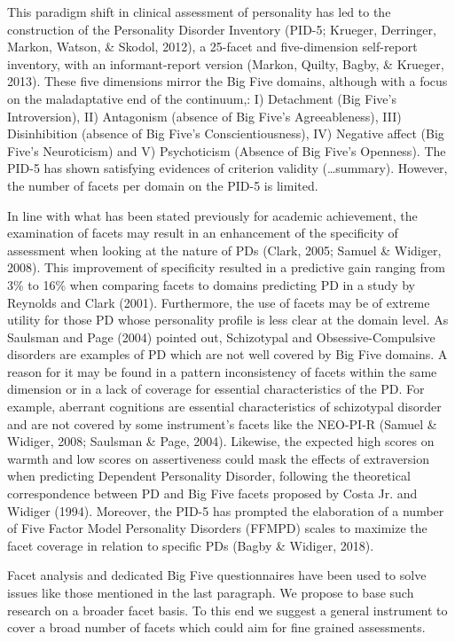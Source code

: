 \documentclass[,man]{apa6}
\theoremstyle{definition}
\theoremstyle{definition}
\theoremstyle{definition}
\theoremstyle{remark}
\begin{document}
This paradigm shift in clinical assessment of personality has led to the
construction of the Personality Disorder Inventory (PID-5; Krueger,
Derringer, Markon, Watson, \& Skodol, 2012), a 25-facet and
five-dimension self-report inventory, with an informant-report version
(Markon, Quilty, Bagby, \& Krueger, 2013). These five dimensions mirror
the Big Five domains, although with a focus on the maladaptative end of
the continuum,: I) Detachment (Big Five's Introversion), II) Antagonism
(absence of Big Five's Agreeableness), III) Disinhibition (absence of
Big Five's Conscientiousness), IV) Negative affect (Big Five's
Neuroticism) and V) Psychoticism (Absence of Big Five's Openness). The
PID-5 has shown satisfying evidences of criterion validity
(\ldots{}summary). However, the number of facets per domain on the PID-5
is limited.

In line with what has been stated previously for academic achievement,
the examination of facets may result in an enhancement of the
specificity of assessment when looking at the nature of PDs (Clark,
2005; Samuel \& Widiger, 2008). This improvement of specificity resulted
in a predictive gain ranging from 3\% to 16\% when comparing facets to
domains predicting PD in a study by Reynolds and Clark (2001).
Furthermore, the use of facets may be of extreme utility for those PD
whose personality profile is less clear at the domain level. As Saulsman
and Page (2004) pointed out, Schizotypal and Obsessive-Compulsive
disorders are examples of PD which are not well covered by Big Five
domains. A reason for it may be found in a pattern inconsistency of
facets within the same dimension or in a lack of coverage for essential
characteristics of the PD. For example, aberrant cognitions are
essential characteristics of schizotypal disorder and are not covered by
some instrument's facets like the NEO-PI-R (Samuel \& Widiger, 2008;
Saulsman \& Page, 2004). Likewise, the expected high scores on warmth
and low scores on assertiveness could mask the effects of extraversion
when predicting Dependent Personality Disorder, following the
theoretical correspondence between PD and Big Five facets proposed by
Costa Jr. and Widiger (1994). Moreover, the PID-5 has prompted the
elaboration of a number of Five Factor Model Personality Disorders
(FFMPD) scales to maximize the facet coverage in relation to specific
PDs (Bagby \& Widiger, 2018).

Facet analysis and dedicated Big Five questionnaires have been used to
solve issues like those mentioned in the last paragraph. We propose to
base such research on a broader facet basis. To this end we suggest a
general instrument to cover a broad number of facets which could aim for
fine grained assessments.
\end{document}
